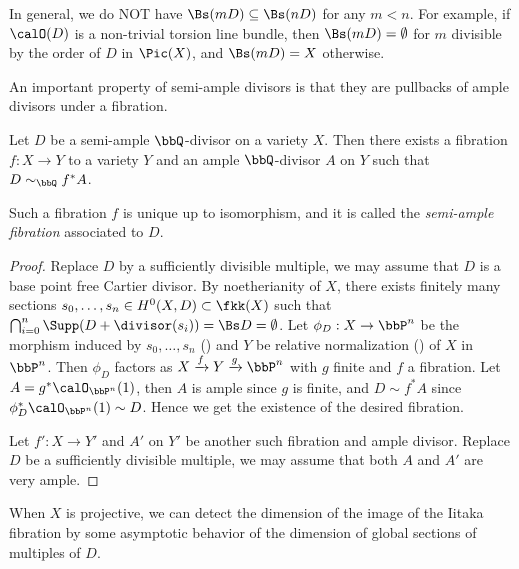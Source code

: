   \begin{remark}
    In general, we do NOT have $\Bs(mD) \subseteq \Bs (nD)$ for any $m < n$. 
    For example, if $\calO(D)$ is a non-trivial torsion line bundle, then $\Bs(mD) = \emptyset$ for $m$ divisible by the order of $D$ in $\Pic(X)$, and $\Bs(mD) = X$ otherwise.
  \end{remark}
    
  An important property of semi-ample divisors is that they are pullbacks of ample divisors under a fibration.

  \begin{theorem}\label{thm:semi-ample_fibration}
    Let $D$ be a semi-ample $\bbQ$-divisor on a variety $X$.
    Then there exists a fibration $f: X \to Y$ to a variety $Y$ and an ample $\bbQ$-divisor $A$ on $Y$ such that $D \sim_\bbQ f^* A$.
    
    Such a fibration $f$ is unique up to isomorphism, and it is called the \emph{semi-ample fibration} associated to $D$.
     \Yang{}
  \end{theorem}
  \begin{proof}
    Replace $D$ by a sufficiently divisible multiple, we may assume that $D$ is a base point free Cartier divisor.
    By noetherianity of $X$, there exists finitely many sections $s_0, \dots, s_n \in H^0(X, D)\subset \fkk(X)$ such that $\bigcap_{i=0}^n \Supp(D + \divisor(s_i)) = \Bs D = \emptyset$.
    Let $\phi_D: X \to \bbP^n$ be the morphism induced by $s_0, \dots, s_n$ (\cite[Chapter II, Theorem 7.1]{Har77}) and $Y$ be relative normalization (\Yang{}) of $X$ in $\bbP^n$.
    Then $\phi_D$ factors as $X \xrightarrow{f} Y \xrightarrow{g} \bbP^n$ with $g$ finite and $f$ a fibration.
    Let $A = g^* \calO_{\bbP^n}(1)$, then $A$ is ample since $g$ is finite, and $D \sim f^* A$ since $\phi_D^* \calO_{\bbP^n}(1) \sim D$.
    Hence we get the existence of the desired fibration.

    Let $f':X \to Y'$ and $A'$ on $Y'$ be another such fibration and ample divisor.
    Replace $D$ be a sufficiently divisible multiple, we may assume that both $A$ and $A'$ are very ample.
    
    


    \Yang{}
  \end{proof}


  When $X$ is projective, we can detect the dimension of the image of the Iitaka fibration by some asymptotic behavior of the dimension of global sections of multiples of $D$.

